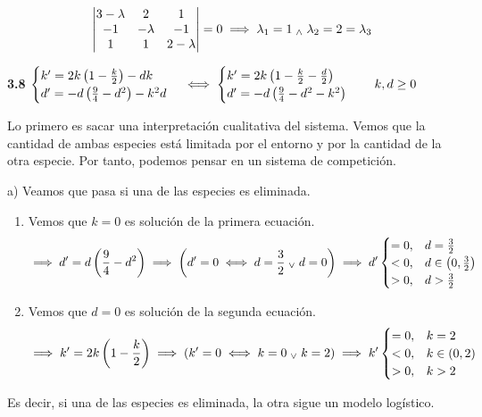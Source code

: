 \[\begin{vmatrix}
		3-\lambda & 2        & 1         \\
		-1        & -\lambda & -1        \\
		1         & 1        & 2-\lambda
	\end{vmatrix} = 0 \implies \lambda_1 = 1 \; _{\wedge} \; \lambda_2 = 2 = \lambda_3\]


\textbf{3.8} $\displaystyle \begin{cases}
		k' = 2k\left(1-\frac{k}{2}\right) - dk \\
		d' = -d\left(\frac{9}{4} - d^2\right) -k^2d
	\end{cases} \iff \begin{cases}
		k' = 2k\left(1-\frac{k}{2} - \frac{d}{2}\right) \\
		d' = -d\left(\frac{9}{4} - d^2 - k^2\right)
	\end{cases} \quad k,d \geq 0$

Lo primero es sacar una interpretación cualitativa del sistema. Vemos que la cantidad de ambas especies está limitada por el entorno y por la cantidad de la otra especie. Por tanto, podemos pensar en un sistema de competición.

a) Veamos que pasa si una de las especies es eliminada.
\begin{enumerate}
	\item Vemos que $k=0$ es solución de la primera ecuación.
	      \[\implies d'=d\left(\frac{9}{4} - d^2\right) \implies \left(d'= 0 \iff d = \frac{3}{2} \; _{\vee} \; d= 0\right) \implies d' \begin{cases}
			      = 0, & d = \frac{3}{2}                   \\
			      < 0, & d \in \left(0, \frac{3}{2}\right) \\
			      > 0, & d > \frac{3}{2}
		      \end{cases}\]
	\item Vemos que $d=0$ es solución de la segunda ecuación.
	      \[\implies k' = 2k\left(1-\frac{k}{2}\right) \implies \left(k'=0 \iff k = 0 \; _{\vee} \; k = 2\right) \implies k' \begin{cases}
			      = 0, & k = 2                   \\
			      < 0, & k \in \left(0, 2\right) \\
			      > 0, & k > 2
		      \end{cases}\]
\end{enumerate}
Es decir, si una de las especies es eliminada, la otra sigue un modelo logístico.

